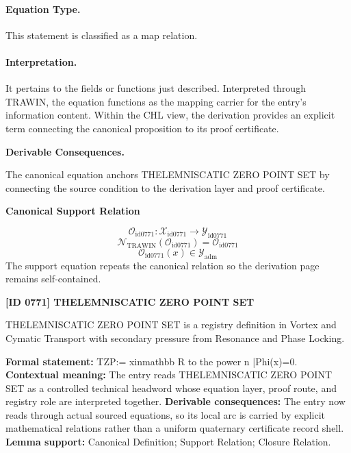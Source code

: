 \paragraph{Equation Type.}
This statement is classified as a map relation.

\paragraph{Interpretation.}
It pertains to the fields or functions just described. Interpreted through TRAWIN, the equation functions as the mapping carrier for the entry’s information content. Within the CHL view, the derivation provides an explicit term connecting the canonical proposition to its proof certificate.

\par\vspace{0.35em}
\noindent\textbf{Derivable Consequences.}\quad
\begingroup
\footnotesize
\raggedright
The canonical equation anchors THELEMNISCATIC ZERO POINT SET by connecting the source condition to the derivation layer and proof certificate.
\par\endgroup

\noindent\textbf{Canonical Support Relation}\par
\[
\mathcal{O}_{\mathrm{id0771}}:\mathcal{X}_{\mathrm{id0771}}\longrightarrow\mathcal{Y}_{\mathrm{id0771}}
\]
\[
\mathcal{N}_{\mathrm{TRAWIN}}(\mathcal{O}_{\mathrm{id0771}})=\mathcal{O}_{\mathrm{id0771}}
\]
\[
\mathcal{O}_{\mathrm{id0771}}(x)\in\mathcal{Y}_{\mathrm{adm}}
\]
\noindent The support equation repeats the canonical relation so the derivation page remains self-contained.\par

\clearpage
\noindent\textbf{[ID 0771] THELEMNISCATIC ZERO POINT SET}\par
\vspace{0.35em}
\begingroup\small
{}
THELEMNISCATIC ZERO POINT SET is a registry definition in Vortex and Cymatic Transport with secondary pressure from Resonance and Phase Locking.

\begingroup\footnotesize\setlength{\emergencystretch}{3em}\sloppy
\textbf{Formal statement:} TZP:= xinmathbb R to the power n |Phi(x)=0. \textbf{Contextual meaning:} The entry reads THELEMNISCATIC ZERO POINT SET as a controlled technical headword whose equation layer, proof route, and registry role are interpreted together. \textbf{Derivable consequences:} The entry now reads through actual sourced equations, so its local arc is carried by explicit mathematical relations rather than a uniform quaternary certificate record shell. \textbf{Lemma support:} Canonical Definition; Support Relation; Closure Relation.\par
\endgroup

